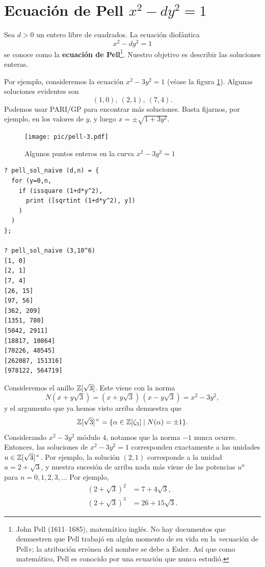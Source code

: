 
\section{Ecuación de Pell \texorpdfstring{$x^2 - dy^2 = 1$}{x² - dy² = 1}}
\label{sec:ecuacion-de-Pell}

Sea $d > 0$ un entero libre de cuadrados. La ecuación diofántica
$$x^2 - dy^2 = 1$$
se conoce como la \textbf{ecuación de Pell}\footnote{John Pell (1611--1685),
  matemático inglés. No hay documentos que demuestren que Pell trabajó en algún
  momento de su vida en la «ecuación de Pell»; la atribución errónea del
  nombre se debe a Euler. Así que como matemático, Pell es conocido por una
  ecuación que nunca estudió.}.
Nuestro objetivo es describir las soluciones enteras.

Por ejemplo, consideremos la ecuación $x^2 - 3y^2 = 1$ (véase la figura
\ref{fig:pell-3}). Algunas soluciones evidentes son
$$(1, 0), ~ (2, 1), ~ (7, 4).$$
Podemos usar PARI/GP para encontrar más soluciones. Basta fijarnos, por ejemplo,
en los valores de $y$, y luego $x = \pm\sqrt{1 + 3y^2}$.

\begin{figure}
  \begin{center}
    \texttt{[image: pic/pell-3.pdf]}
  \end{center}

  \caption{Algunos puntos enteros en la curva $x^2 - 3y^2 = 1$}
  \label{fig:pell-3}
\end{figure}

\begin{shaded}
\begin{verbatim}
? pell_sol_naive (d,n) = {
  for (y=0,n,
    if (issquare (1+d*y^2),
      print ([sqrtint (1+d*y^2), y])
    )
  )
};

? pell_sol_naive (3,10^6)
[1, 0]
[2, 1]
[7, 4]
[26, 15]
[97, 56]
[362, 209]
[1351, 780]
[5042, 2911]
[18817, 10864]
[70226, 40545]
[262087, 151316]
[978122, 564719]
\end{verbatim}
\end{shaded}

Consideremos el anillo $\mathbb{Z} [\sqrt{3}]$. Este viene con la norma
$$N (x + y\sqrt{3}) = (x + y\sqrt{3})\,(x - y\sqrt{3}) = x^2 - 3y^2,$$
y el argumento que ya hemos visto arriba demuestra que
\[ \mathbb{Z} [\sqrt{3}]^\times
       = \{ \alpha \in \mathbb{Z} [\zeta_3] \mid N (\alpha) = \pm 1 \}. \]
Considerando $x^2 - 3y^2$ módulo $4$, notamos que la norma $-1$ nunca
ocurre. Entonces, las soluciones de ${x^2 - 3y^2 = 1}$ corresponden exactamente
a las unidades $u \in \mathbb{Z} [\sqrt{3}]^\times$. Por ejemplo, la solución $(2,1)$
corresponde a la unidad $u = 2 + \sqrt{3}$, y nuestra sucesión de arriba nada
más viene de las potencias $u^n$ para $n = 0,1,2,3,\ldots$ Por ejemplo,
\begin{align*}
  (2 + \sqrt{3})^2 & = 7 + 4\sqrt{3},\\
  (2 + \sqrt{3})^3 & = 26 + 15\sqrt{3}.
\end{align*}

